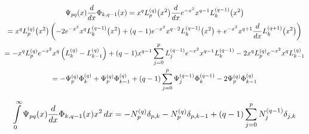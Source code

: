 \documentclass{article}[draft]
\begin{document}
\begin{multline*}
\Psi_{pq}\of{x} \frac{d}{dx}\Phi_{k, q-1}\of{x} 
= x^q \lp{q}{p}\of{x^2} \frac{d}{dx} e^{-x^2} x^{q-1} \lp{q-1}{k}\of{x^2}
\\
= x^q \lp{q}{p}\of{x^2} \left(
- 2 e^{-x^2} x^{q} L^{(q-1)}_k\of{x^2}
+ (q-1) e^{-x^2} x^{q-2} L^{(q-1)}_k\of{x^2}
+ e^{-x^2} x^{q+1} \frac{d}{dx} L^{(q+1)}_k\of{x^2}
\right)
\\
= - x^{q} \lp{q}{p} 
e^{-x^2} x^{q} \left( \lp{q}{k} - \lp{q}{k-1} \right)
+ (q-1) x^{q-1} \sum_{j=0}^{p} \lp{q-1}{j} e^{-x^2} x^{q-1} \lp{q-1}{k} 
- 2 x^q \lp{q}{p} e^{-x^2} x^q \lp{q}{k-1}
\\
= - \tfun{q}{p} \bfun{q}{k} 
+ \tfun{q}{p} \bfun{q}{k-1}
+ (q-1) \sum_{j=0}^{p} \tfun{q-1}{j} \bfun{q-1}{k} 
- 2 \tfun{q}{p} \bfun{q}{k-1}
\end{multline*}

\begin{multline*}
\myint_0^\infty \Psi_{pq}\of{x} \frac{d}{dx}\Phi_{k, q-1}\of{x} x^2 \diff{x}
= -  \nfun{q}{p} \delta_{p,k} 
- \nfun{q}{p} \delta_{p,k-1}
+ (q-1) \sum_{j=0}^{p} \nfun{q-1}{j} \delta_{j,k}
\end{multline*}
\end{document}
